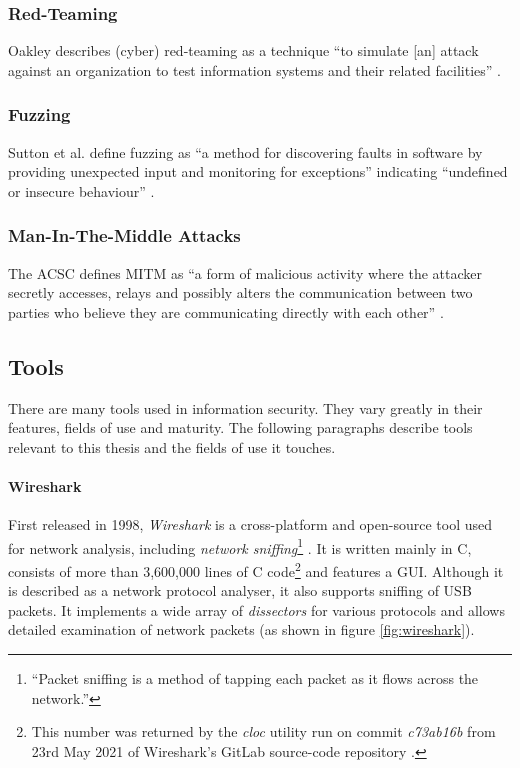 \subsubsection{Red-Teaming}
Oakley describes (cyber) red-teaming as a technique \enquote{to simulate [an] attack against an organization to test information systems and their related facilities} \cite[p.1-14]{Oakley2019}.

\subsubsection{Fuzzing}
Sutton et al. define fuzzing as \enquote{a method for discovering faults in software by providing unexpected input and monitoring for exceptions} indicating \enquote{undefined or insecure behaviour} \cite[p.22]{Sutton2007}.

\subsubsection{Man-In-The-Middle Attacks}
The \ac{ACSC} defines \ac{MITM} as \enquote{a form of malicious activity where the attacker secretly accesses, relays and possibly alters the communication between two parties who believe they are communicating directly with each other} \cite{pitm2020}.

\subsection{Tools}
There are many tools used in information security. They vary greatly in their features, fields of use and maturity. The following paragraphs describe tools relevant to this thesis and the fields of use it touches.

\paragraph{Wireshark} First released in 1998, \emph{Wireshark} is a cross-platform and open-source tool used for network analysis, including \emph{network sniffing}\footnote{\enquote{Packet sniffing is a method of tapping each packet as it flows across the network.}\cite{packetsniffing}} \cite{wireshark}. It is written mainly in C, consists of more than 3,600,000 lines of C code\footnote{This number was returned by the \emph{cloc} utility run on commit \emph{c73ab16b} from 23rd May 2021 of Wireshark's GitLab source-code repository \cite{wiresharkgit}.} and features a \ac{GUI}. Although it is described as a network protocol analyser, it also supports sniffing of \ac{USB} packets. It implements a wide array of \emph{dissectors} for various protocols and allows detailed examination of network packets (as shown in figure \ref{fig:wireshark}).

